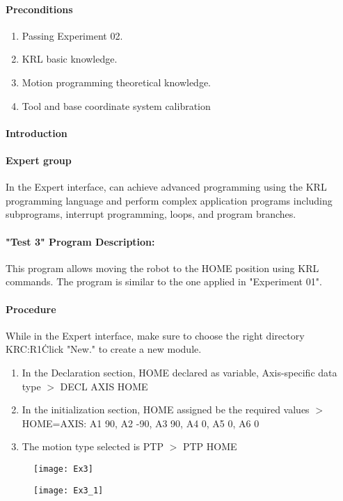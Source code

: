 \paragraph{Preconditions}
\begin{enumerate}
	\item Passing Experiment 02.
	\item KRL basic knowledge.
	\item Motion programming theoretical knowledge. 
	\item Tool and base coordinate system calibration
\end{enumerate}
\paragraph{Introduction}
\paragraph{Expert group}
In the Expert interface, can achieve advanced programming using the KRL programming language and perform complex application programs including subprograms, interrupt programming, loops, and program branches. 
\paragraph{"Test 3" Program Description:}
This program allows moving the robot to the HOME position using KRL commands. The program is similar to the one applied in "Experiment 01".
\paragraph{Procedure}
While in the Expert interface, make sure to choose the right directory KRC:R1\.Click "New." to create a new module. 
\begin{enumerate}
	\item In the Declaration section, HOME declared as variable, Axis-specific data type $>$ DECL AXIS HOME
	\item In the initialization section, HOME assigned be the required values $>$ HOME={AXIS: A1 90, A2 -90, A3 90, A4 0, A5 0, A6 0}
	\item The motion type selected is PTP $>$ PTP HOME
\end{enumerate}
\newpage
\begin{figure}[H]
	\texttt{[image: Ex3]}
	\centering
\end{figure}
\begin{figure}[H]
	\texttt{[image: Ex3\_1]}
	\centering
\end{figure}
\newpage
